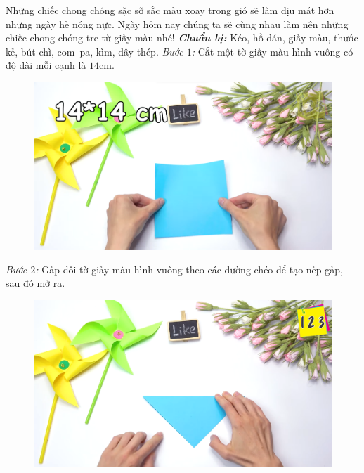 \begin{multicols}{2}
	Những chiếc chong chóng sặc sỡ sắc màu xoay trong gió sẽ làm dịu mát hơn những ngày hè nóng nực. Ngày hôm nay chúng ta sẽ cùng nhau làm nên những chiếc chong chóng tre từ giấy màu nhé!
	\vskip 0.1cm
	\textbf{\color{toancuabi}\textit{Chuẩn bị:}} Kéo, hồ dán, giấy màu, thước kẻ, bút chì, com--pa, kìm, dây thép.
	\vskip 0.1cm
	\textit{Bước $1$:} Cắt một tờ giấy màu hình vuông có độ dài mỗi cạnh là $14$cm.
	\begin{figure}[H]
		\vspace*{-5pt}
		\centering
		\captionsetup{labelformat= empty, justification=centering}
		\includegraphics[width= 0.8\linewidth]{1}
		\vspace*{-10pt}
	\end{figure}
	\textit{Bước $2$:} Gấp đôi tờ giấy màu hình vuông theo các đường chéo để tạo nếp gấp, sau đó mở ra.
	\begin{figure}[H]
		\vspace*{-5pt}
		\centering
		\captionsetup{labelformat= empty, justification=centering}
		\includegraphics[width= 0.8\linewidth]{2a}
	\end{figure}
	\begin{figure}[H]
		\vspace*{5pt}

\end{figure}
\end{multicols}
